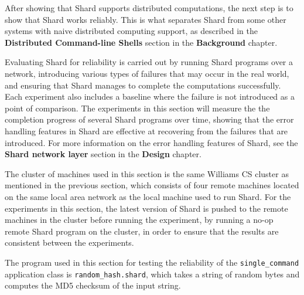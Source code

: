 \documentclass[oneside]{report}
\begin{document}

After showing that Shard supports distributed computations, the next step is to show that Shard works reliably.
This is what separates Shard from some other systems with naive distributed computing support, as described in the \textbf{Distributed Command-line Shells} section in the \textbf{Background} chapter.

Evaluating Shard for reliability is carried out by running Shard programs over a network, introducing various types of failures that may occur in the real world, and ensuring that Shard manages to complete the computations successfully.
Each experiment also includes a baseline where the failure is not introduced as a point of comparison.
The experiments in this section will measure the the completion progress of several Shard programs over time, showing that the error handling features in Shard are effective at recovering from the failures that are introduced.
For more information on the error handling features of Shard, see the \textbf{Shard network layer} section in the \textbf{Design} chapter.

The cluster of machines used in this section is the same Williams CS cluster as mentioned in the previous section, which consists of four remote machines located on the same local area network as the local machine used to run Shard.
For the experiments in this section, the latest version of Shard is pushed to the remote machines in the cluster before running the experiment, by running a no-op remote Shard program on the cluster, in order to ensure that the results are consistent between the experiments.

The program used in this section for testing the reliability of the \texttt{single\_command} application class is \texttt{random\_hash.shard}, which takes a string of random bytes and computes the MD5 checksum of the input string.
\end{document}
